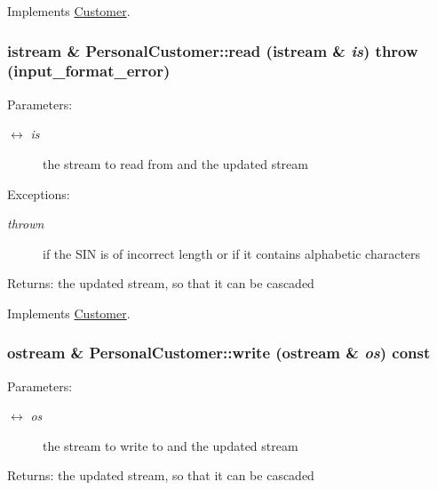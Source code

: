 Implements \hyperlink{classCustomer_406fb74a887e5f0eb91aa49301534bb4}{Customer}.\hypertarget{classPersonalCustomer_81861fd3353273de8c4da5f273ecfd26}{
\subsubsection[read]{\setlength{\rightskip}{0pt plus 5cm}istream \& PersonalCustomer::read (istream \& {\em is})  throw (input\_\-format\_\-error)}}
\label{classPersonalCustomer_81861fd3353273de8c4da5f273ecfd26}


\begin{Desc}
\item[Parameters:]
\begin{description}
\item[\mbox{$\leftrightarrow$} {\em is}]the stream to read from and the updated stream \end{description}
\end{Desc}
\begin{Desc}
\item[Exceptions:]
\begin{description}
\item[{\em thrown}]if the SIN is of incorrect length or if it contains alphabetic characters \end{description}
\end{Desc}
\begin{Desc}
\item[Returns:]the updated stream, so that it can be cascaded \end{Desc}


Implements \hyperlink{classCustomer_3327c4e5e7f3a9435f3b71372778386a}{Customer}.\hypertarget{classPersonalCustomer_123975841172a6933c0358907d29f495}{
\subsubsection[write]{\setlength{\rightskip}{0pt plus 5cm}ostream \& PersonalCustomer::write (ostream \& {\em os}) const}}
\label{classPersonalCustomer_123975841172a6933c0358907d29f495}


\begin{Desc}
\item[Parameters:]
\begin{description}
\item[\mbox{$\leftrightarrow$} {\em os}]the stream to write to and the updated stream \end{description}
\end{Desc}
\begin{Desc}
\item[Returns:]the updated stream, so that it can be cascaded \end{Desc}


